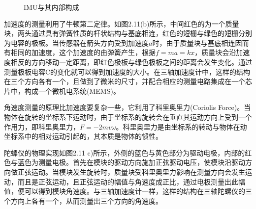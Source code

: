 \begin{figure}[htb]
    \caption{IMU与其内部构成}
    \label{fig:subfigss}
\end{figure}

加速度的测量利用了牛顿第二定律。如图2.11(b)所示，中间红色的为一个质量块，两头通过具有弹簧性质的杆状结构与基底相连，红色的短栅与绿色的短栅分别为电容的极板。当传感器在箭头方向受到加速度$a$时，由于质量块与基底相连因而有相同的加速度，这个加速度的由弹簧产生，根据$f=ma=kx$，质量块会沿加速度相反的方向移动一定距离，即红色极板与绿色极板之间的距离会发生变化。通过测量极板电容C的变化就可以得到加速度的大小。在三轴加速度计中，这样的结构在三个方向各有一个，且做到了微米的尺寸，并配合相应的测量电路集成在一个芯片中，构成一个微机电系统(MEMS)。

角速度测量的原理比加速度要复杂一些，它利用了科里奥里力(Coriolis Force)。当物体在旋转的坐标系下运动时，由于坐标系的旋转会在垂直其运动方向上受到一个作用力，即科里奥里力，$F=-2mvω$。科里奥里力是由坐标系的转动与物体在动坐标系中的相对运动引起的，其本质是物体的惯性。

陀螺仪的物理实现如图2.11 c)所示，外侧的蓝色与黄色部分为驱动电极，内部的红色与蓝色为测量电极。首先在模块的驱动方向施加正弦驱动电压，使模块沿驱动方向做正弦运动。当模块发生旋转时，质量块受科里奥里力影响在测量方向会发生运动，而且是正弦运动，且正弦运动的幅值与角速度成正比，通过电极测量出此幅值，便可以得到模块角速度。与三轴加速度计一样，这样的结构在三轴陀螺仪的三个方向上各有一个，从而测量出三个方向的角速度。

